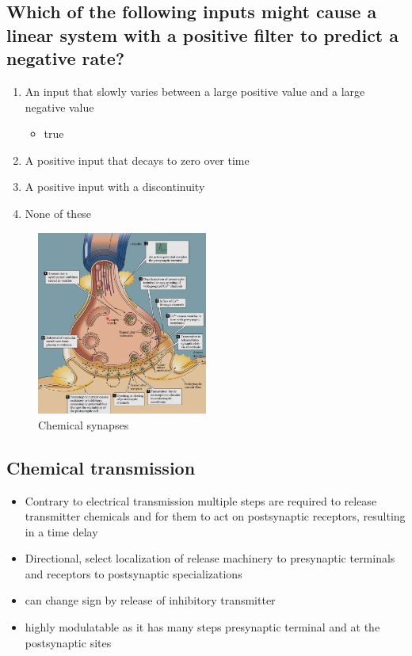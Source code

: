 \documentclass{article}
\begin{document}
\subsection*{Which of the following inputs might cause a linear system with a positive filter to predict a negative rate?}

\begin{enumerate}
    \item An input that slowly varies between a large positive value and a large negative value
      \begin{itemize}
        \item true
      \end{itemize}
    \item A positive input that decays to zero over time
    \item A positive input with a discontinuity
    \item None of these
\end{enumerate}

\begin{figure}[h]
\centering
\includegraphics[width=0.5\textwidth]{assets/chemical-synapses.png}
\caption{Chemical synapses}
\end{figure}

\subsection*{Chemical transmission}

\begin{itemize}
    \item Contrary to electrical transmission multiple steps are required to release transmitter chemicals and for them to act on postsynaptic receptors, resulting in a time delay
    \item Directional, select localization of release machinery to presynaptic terminals and receptors to postsynaptic specializations
    \item can change sign by release of inhibitory transmitter
    \item highly modulatable as it has many steps presynaptic terminal and at the postsynaptic sites
\end{itemize}
\end{document}
